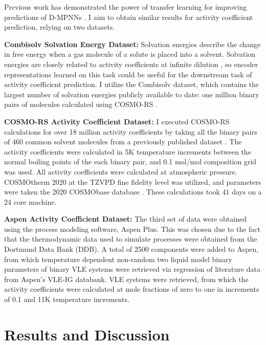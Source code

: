 Previous work has demonstrated the power of transfer learning for improving predictions of D-MPNNs \cite{Vermeire2021}. I aim to obtain similar results for activity coefficient prediction, relying on two datasets.

\noindent
\textbf{Combisolv Solvation Energy Dataset:} Solvation energies describe the change in free energy when a gas molecule of a solute is placed into a solvent. Solvation energies are closely related to activity coefficients at infinite dilution \cite{Moine2017}, so encoder representations learned on this task could be useful for the downstream task of activity coefficient prediction. I utilize the Combisolv dataset, which contains the largest number of solvation energies publicly available to date: one million binary pairs of molecules calculated using COSMO-RS \cite{Vermeire2021}.

\noindent
\textbf{COSMO-RS Activity Coefficient Dataset:} I executed COSMO-RS calculations for over 18 million activity coefficients by taking all the binary pairs of 460 common solvent molecules from a previously published dataset \cite{Amar2019}. The activity coefficients were calculated in 5K temperature increments between the normal boiling points of the each binary pair, and 0.1 mol/mol composition grid was used. All activity coefficients were calculated at atmospheric pressure. COSMOtherm 2020 at the TZVPD fine fidelity level was utilized, and parameters were taken the 2020 COSMObase database \cite{Klamt2010}. These calculations took 41 days on a 24 core machine. 

\noindent
\textbf{Aspen Activity Coefficient Dataset:} The third set of data were obtained using the process modeling software, Aspen Plus. This was chosen due to the fact that the thermodynamic data used to simulate processes were obtained from the Dortmund Data Bank (DDB). A total of 2500 components were added to Aspen, from which temperature dependent non-random two liquid model binary parameters of binary VLE systems were retrieved via regression of literature data from Aspen’s VLE-IG databank. VLE systems were retrieved, from which the activity coefficients were calculated at mole fractions of zero to one in increments of 0.1 and 11K temperature increments. 


\section{Results and Discussion}

